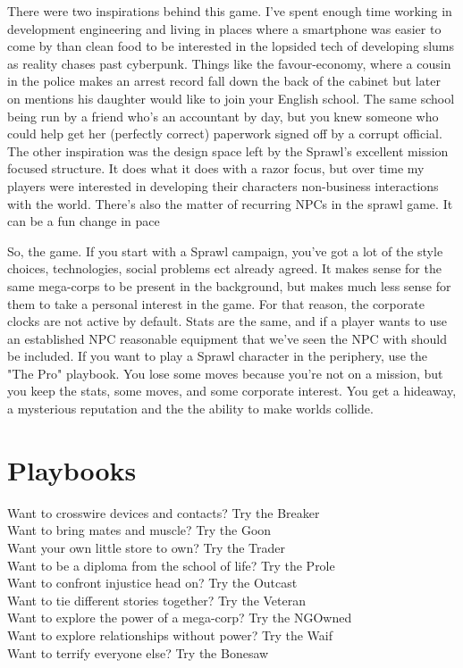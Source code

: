 \documentclass{tufte-book}
\begin{document}
There were two inspirations behind this game. I've spent enough time working in development engineering and living in places where a smartphone was easier to come by than clean food to be interested in the lopsided tech of developing slums as reality chases past cyberpunk. Things like the favour-economy, where a cousin in the police makes an arrest record fall down the back of the cabinet but later on mentions his daughter would like to join your English school.  The same school being run by a friend who's an accountant by day, but you knew someone who could help get her (perfectly correct) paperwork signed off by a corrupt official. The other inspiration was the design space left by the Sprawl's excellent mission focused structure. It does what it does with a razor focus, but over time my players were interested in developing their characters non-business interactions with the world. There's also the matter of recurring NPCs in the sprawl game. It can be a fun change in pace 

So, the game. If you start with a Sprawl campaign, you've got a lot of the style choices, technologies, social problems ect already agreed. It makes sense for the same mega-corps to be present in the background, but makes much less sense for them to take a personal interest in the game. For that reason, the corporate clocks are not active by default. Stats are the same, and if a player wants to use an established NPC reasonable equipment that we've seen the NPC with should be included. If you want to play a Sprawl character in the periphery, use the "The Pro" playbook. You lose some moves because you're not on a mission, but you keep the stats, some moves, and some corporate interest. You get a hideaway, a mysterious reputation and the the ability to make worlds collide.


\chapter{Playbooks} \label{ch:playbooks}

Want to crosswire devices and contacts? Try the Breaker\\
Want to bring mates and muscle? Try the Goon\\
Want your own little store to own? Try the Trader\\
Want to be a diploma from the school of life? Try the Prole\\
Want to confront injustice head on? Try the Outcast\\
Want to tie different stories together? Try the Veteran\\
Want to explore the power of a mega-corp? Try the NGOwned\\
Want to explore relationships without power? Try the Waif\\ 
Want to terrify everyone else? Try the Bonesaw\\
\end{document}
